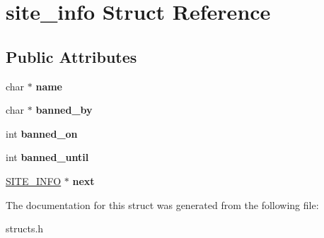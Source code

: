 \hypertarget{structsite__info}{\section{site\-\_\-info Struct Reference}
\label{structsite__info}
}
\subsection*{Public Attributes}
\begin{DoxyCompactItemize}
\item 
\hypertarget{structsite__info_aeb8333222942b254f8ec2cdb141c4136}{char $\ast$ {\bfseries name}}\label{structsite__info_aeb8333222942b254f8ec2cdb141c4136}

\item 
\hypertarget{structsite__info_a6e91d77e15687804e91f05ec61252162}{char $\ast$ {\bfseries banned\-\_\-by}}\label{structsite__info_a6e91d77e15687804e91f05ec61252162}

\item 
\hypertarget{structsite__info_abf2619a1a6c000e746ed8098e0a463ae}{int {\bfseries banned\-\_\-on}}\label{structsite__info_abf2619a1a6c000e746ed8098e0a463ae}

\item 
\hypertarget{structsite__info_af7c62b1c6c03b33ac1b853f398b3ab39}{int {\bfseries banned\-\_\-until}}\label{structsite__info_af7c62b1c6c03b33ac1b853f398b3ab39}

\item 
\hypertarget{structsite__info_a23c00a3e8306769f4e8c759762758617}{\hyperlink{structsite__info}{S\-I\-T\-E\-\_\-\-I\-N\-F\-O} $\ast$ {\bfseries next}}\label{structsite__info_a23c00a3e8306769f4e8c759762758617}

\end{DoxyCompactItemize}


The documentation for this struct was generated from the following file\-:\begin{DoxyCompactItemize}
\item 
structs.\-h\end{DoxyCompactItemize}
